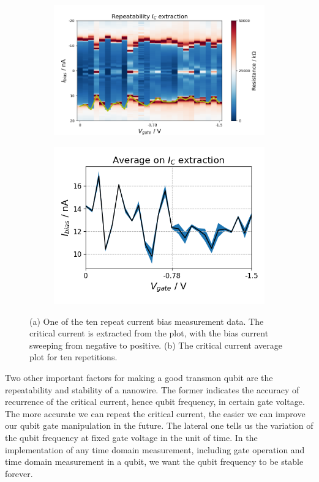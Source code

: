 \begin{figure}[h!]
    \centering
    \begin{subfigure}[b]{0.54\textwidth}
         \centering
         \includegraphics[width=\textwidth]{Pic/Ic_rep_extract.png}
         \caption{}
         \label{}
     \end{subfigure}
     \hfill
     \begin{subfigure}[b]{0.44\textwidth}
         \centering
         \includegraphics[width=\textwidth]{Pic/Ic_average.png}
         \caption{}
         \label{}
     \end{subfigure}
    \caption{(a) One of the ten repeat current bias measurement data. The critical current is extracted from the plot, with the bias current sweeping from negative to positive. (b) The critical current average plot for ten repetitions.}
    \label{TaNWonchip2}
\end{figure}
Two other important factors for making a good transmon qubit are the repeatability and stability of a nanowire. The former indicates the accuracy of recurrence of the critical current, hence qubit frequency, in certain gate voltage. The more accurate we can repeat the critical current, the easier we can improve our qubit gate manipulation in the future. The lateral one tells us the variation of the qubit frequency at fixed gate voltage in the unit of time. In the implementation of any time domain measurement, including gate operation and time domain measurement in a qubit, we want the qubit frequency to be stable forever.


